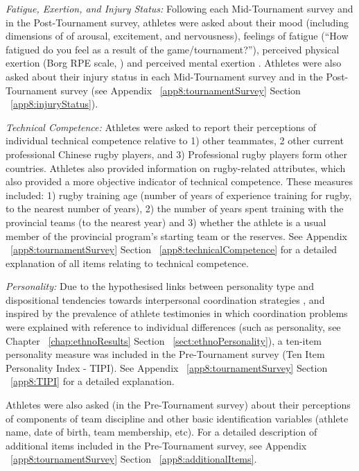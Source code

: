 \begin{CJK}{UTF8}{gbsn}



\textit{Fatigue, Exertion, and Injury Status:} Following each Mid-Tournament survey and in the Post-Tournament survey, athletes were asked about their mood (including dimensions of  of arousal, excitement, and nervousness), feelings of fatigue (``How fatigued do you feel as a result of the game/tournament?''), perceived physical exertion (Borg RPE scale, \citep{Borg1990}) and perceived mental exertion \citep[see][]{Noakes2012a}. Athletes were also asked about their injury status in each Mid-Tournament survey and in the Post-Tournament survey (see Appendix ~\ref{app8:tournamentSurvey} Section ~\ref{app8:injuryStatus}).

\textit{Technical Competence:} Athletes were asked to report their perceptions of individual technical competence relative to 1) other teammates, 2 other current professional Chinese rugby players, and  3) Professional rugby players form other countries.  Athletes also provided information on rugby-related attributes, which also provided a more objective indicator of technical competence.  These measures included: 1) rugby training age (number of years of experience training for rugby, to the nearest number of years), 2) the number of years spent training with the provincial teams (to the nearest year) and 3) whether the athlete is a usual member of the provincial program's starting team or the reserves.  See Appendix ~\ref{app8:tournamentSurvey} Section ~\ref{app8:technicalCompetence} for a detailed explanation of all items relating to technical competence.

\textit{Personality:} Due to the hypothesised links between personality type and dispositional tendencies towards interpersonal coordination strategies \citep[e.g.][]{Richards2007,Marsh2009,Sevdalis2014}, and inspired by the prevalence of athlete testimonies in which coordination problems were explained with reference to individual differences (such as personality, see Chapter ~\ref{chap:ethnoResults} Section ~\ref{sect:ethnoPersonality}),  a ten-item personality measure was included in the Pre-Tournament survey (Ten Item Personality Index - TIPI)\citep{Gosling2003}. See Appendix ~\ref{app8:tournamentSurvey} Section ~\ref{app8:TIPI} for a detailed explanation.

Athletes were also asked (in the Pre-Tournament survey) about their perceptions of components of team discipline and other basic identification variables (athlete name, date of birth, team membership, etc).  For a detailed description of additional items included in the Pre-Tournament survey, see Appendix ~\ref{app8:tournamentSurvey} Section ~\ref{app8:additionalItems}.








\end{CJK}
